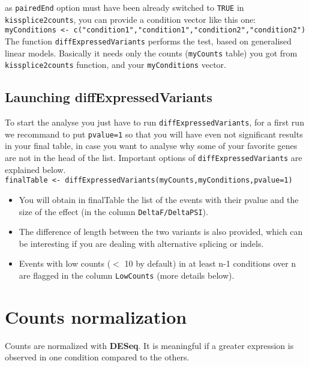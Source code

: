 \documentclass[a4paper,10pt]{article}
\begin{document}
as \texttt{pairedEnd} option must have been already switched to \texttt{TRUE} in \texttt{kissplice2counts}, you can provide a condition vector like this one:\\ 

\texttt{myConditions <- c("condition1","condition1","condition2","condition2")}\\

The function \texttt{diffExpressedVariants} performs the test, based on generalised linear models. Basically it needs only the counts (\texttt{myCounts} table) you got from \texttt{kissplice2counts} function, and your \texttt{myConditions} vector.

\subsection{Launching diffExpressedVariants}
To start the analyse you just have to run \texttt{diffExpressedVariants}, for a first run we recommand to put \texttt{pvalue=1} so that you will have even not significant results in your final table, in case you want to analyse why some of your favorite genes are not in the head of the list. Important options of \texttt{diffExpressedVariants} are explained below.\\

\texttt{finalTable <- diffExpressedVariants(myCounts,myConditions,pvalue=1)}
\begin{itemize}
 \item You will obtain in finalTable the list of the events with their pvalue and the size of the effect (in the column \texttt{DeltaF/DeltaPSI}). 
  \item The difference of length between the two variants is also provided, which can be interesting if you are dealing with alternative splicing or indels.
 \item Events with low counts ($<$ 10 by default) in at least n-1 conditions over n are flagged in the column \texttt{LowCounts} (more details below).
\end{itemize}





\section{Counts normalization}
Counts are normalized with \textbf{DESeq}. It is meaningful if a greater expression is observed in one condition compared to the others.
\end{document}
